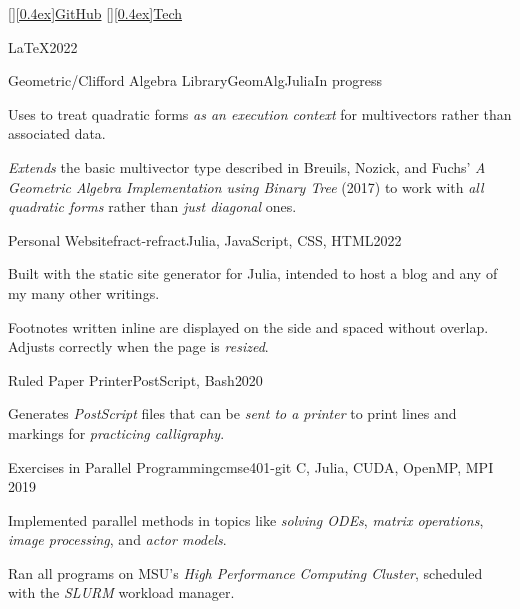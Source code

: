 \projectheader
   {}%
   {\normalfont\underline{\raisebox{0pt}[\height][0.4ex]{GitHub}}}%
   {\normalfont\underline{\raisebox{0pt}[\height][0.4ex]{Tech}}}%
   {}
\vspace{1ex}

\LaTeX{2022}
\vspace{\dimexpr\bodyspace-\headerspace}

\begin{project}{Geometric/Clifford Algebra Library}{GeomAlg}{Julia}{In progress}
    \item Uses  to treat quadratic forms
        \emph{as an execution context} for multivectors
        rather than associated data.
    \item \emph{Extends} the basic multivector type
        described in Breuils, Nozick, and Fuchs'
        \textit{A Geometric Algebra Implementation using Binary Tree} (2017)
        to work with \emph{all quadratic forms}
        rather than \emph{just diagonal} ones.
\end{project}

\begin{project}{Personal Website}{fract-refract}{Julia, JavaScript, CSS, HTML}{2022}
    \item Built with the  static site generator for Julia,
        intended to host a blog and any of my many other writings.
    \item Footnotes written inline are displayed on the side
        and spaced without overlap.
    Adjusts correctly when the page is \emph{resized}.
\end{project}

\begin{project}{Ruled Paper Printer}{}{PostScript, Bash}{2020}
    \item Generates \emph{PostScript} files
        that can be \emph{sent to a printer} to print lines and markings
        for \emph{practicing calligraphy}.
\end{project}

\begin{project}{Exercises in Parallel Programming}{cmse401-git}%
               {C, Julia, CUDA, OpenMP, MPI}%
               {2019}
    \item Implemented parallel methods in topics like
        \emph{solving ODEs}, 
        \emph{matrix operations},
        \emph{image processing},
        and \emph{actor models}.
    \item Ran all programs
        on MSU's \emph{High Performance Computing Cluster},
        scheduled with the \emph{SLURM} workload manager.
\end{project}

